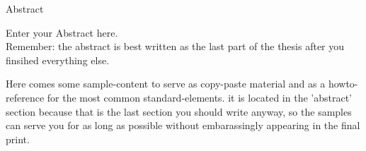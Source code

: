 \documentclass[a4paper, 12pt,oneside]{article}
\begin{document}
%
%
%
%

\hypersetup{pageanchor=false}
\graphicspath{{./img/}} %




\thispagestyle{empty}%

 
 


%
%
%
%



%
%
%
%

\thispagestyle{empty}
\hypersetup{hidelinks}
\tableofcontents
\thispagestyle{empty}
\newpage
\thispagestyle{plain}
\setcounter{page}{1}
\onehalfspacing

\begin{center}
{\LARGE Abstract}
\end{center}

Enter your Abstract here. \\
Remember: the abstract is best written as the last part of the thesis after you finsihed everything else. 



Here comes some sample-content to serve as copy-paste material and as a howto-reference for the most common standard-elements. it is located in the 'abstract' section because that is the last section you should write anyway, so the samples can serve you for as long as possible without embarassingly appearing in the final print. \\
\end{document}
